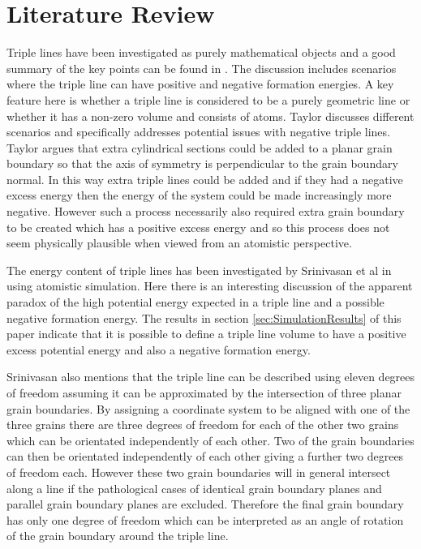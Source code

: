 \documentclass[12pt,a4paper]{book}
\begin{document}
\chapter{Literature Review} \label{ch:1}

\nocite{*}


 
Triple lines have been investigated as purely mathematical objects and a good summary of the key points can be found in \cite{Taylor1999}. The discussion includes scenarios where the triple line can have positive and negative formation energies. A key feature here is whether a triple line is considered to be a purely geometric line or whether it has a non-zero volume and consists of atoms. Taylor discusses different scenarios and specifically addresses potential issues with negative triple lines. Taylor argues that extra cylindrical sections could be added to a planar grain boundary so that the axis of symmetry is perpendicular to the grain boundary normal. In this way extra triple lines could be added and if they had a negative excess energy then the energy of the system could be made increasingly more negative. However such a process necessarily also required extra grain boundary to be created which has a positive excess energy and so this process does not seem physically plausible when viewed from an atomistic perspective.


The energy content of triple lines has been investigated by Srinivasan et al in \cite{Srinivasan1999} using atomistic simulation. Here there is an interesting discussion of the apparent paradox of the high potential energy expected in a triple line and a possible negative formation energy. The results in section \ref{sec:SimulationResults} of this paper indicate that it is possible to define a triple line volume to have a positive excess potential energy and also a negative formation energy. 

Srinivasan also mentions that the triple line can be described using eleven degrees of freedom assuming it can be approximated by the intersection of three planar grain boundaries. By assigning a coordinate system to be aligned with one of the three grains there are three degrees of freedom for each of the other two grains which can be orientated independently of each other. Two of the grain boundaries can then be orientated independently of each other giving a further two degrees of freedom each. However these two grain boundaries will in general intersect along a line if the pathological cases of identical grain boundary planes and parallel grain boundary planes are excluded. Therefore the final grain boundary has only one degree of freedom which can be interpreted as an angle of rotation of the grain boundary around the triple line.
\end{document}
